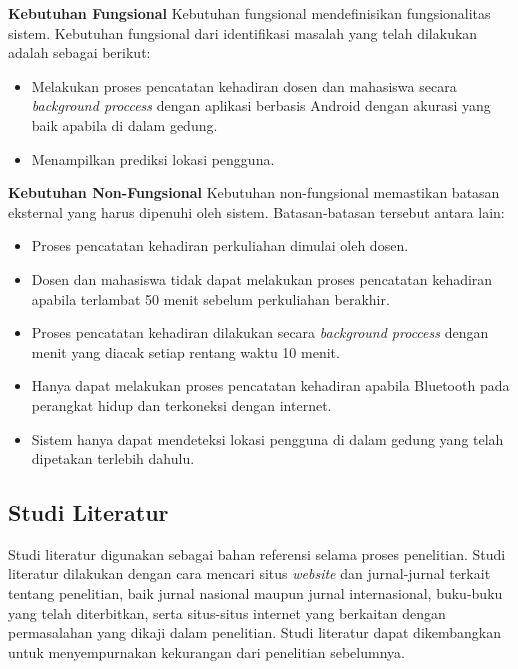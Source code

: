 \par \textbf{Kebutuhan Fungsional} Kebutuhan fungsional mendefinisikan fungsionalitas sistem. Kebutuhan fungsional dari identifikasi masalah yang telah dilakukan adalah sebagai berikut:

\begin{itemize}
\item Melakukan proses pencatatan kehadiran dosen dan mahasiswa secara \textit{background proccess} dengan aplikasi berbasis Android dengan akurasi yang baik apabila di dalam gedung.

\item Menampilkan prediksi lokasi pengguna.

\end{itemize}

\par \textbf{Kebutuhan Non-Fungsional} Kebutuhan non-fungsional memastikan batasan eksternal yang harus dipenuhi oleh sistem. Batasan-batasan tersebut antara lain:
\begin{itemize}
\item Proses pencatatan kehadiran perkuliahan dimulai oleh dosen.

\item Dosen dan mahasiswa tidak dapat melakukan proses pencatatan kehadiran apabila terlambat 50 menit sebelum perkuliahan berakhir.

\item Proses pencatatan kehadiran dilakukan secara \textit{background proccess} dengan menit yang diacak setiap rentang waktu 10 menit.

\item Hanya dapat melakukan proses pencatatan kehadiran apabila Bluetooth pada perangkat hidup dan terkoneksi dengan internet.

\item Sistem hanya dapat mendeteksi lokasi pengguna di dalam gedung yang telah dipetakan terlebih dahulu.
 
\end{itemize}

\subsection{Studi Literatur}
Studi literatur digunakan sebagai bahan referensi selama proses penelitian. Studi literatur dilakukan dengan cara mencari situs \textit{website} dan jurnal-jurnal terkait tentang penelitian, baik jurnal nasional maupun jurnal internasional, buku-buku yang telah diterbitkan, serta situs-situs internet yang berkaitan dengan permasalahan yang dikaji dalam penelitian. Studi literatur dapat dikembangkan untuk menyempurnakan kekurangan dari penelitian sebelumnya. 

